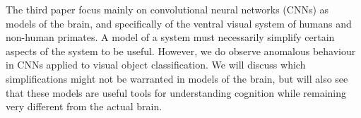 \documentclass[12pt]{article} %
\begin{document}
\vspace{3mm}

The third paper focus mainly on convolutional
neural networks (CNNs) as models of the brain,
and specifically of the ventral visual system
of humans and non-human primates.
A model of a system must necessarily simplify
certain aspects of the system to be useful.
However, we do observe anomalous behaviour in
CNNs applied to visual object classification.
We will discuss which simplifications might
not be warranted in models of the brain,
but will also see that these models are useful
tools for understanding cognition while remaining
very different from the actual brain.






\printbibliography
\end{document}
